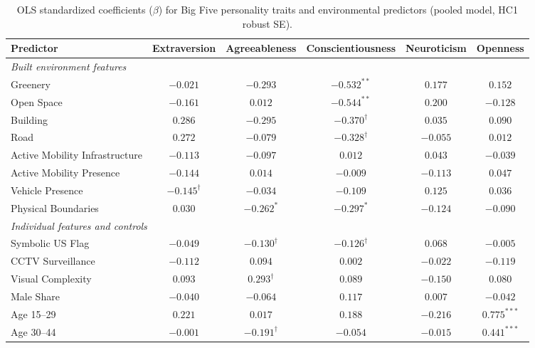 \begin{table}[htbp]
\centering
\footnotesize
\caption{OLS standardized coefficients ($\beta$) for Big Five personality traits and environmental predictors (pooled model, HC1 robust SE).}
\label{tab:ols_betas_ours_v2}
\begin{adjustbox}{max width=\linewidth, max totalheight=0.85\textheight, center}
\begin{tabular}{lccccc}
\toprule
\textbf{Predictor} & \textbf{Extraversion} & \textbf{Agreeableness} & \textbf{Conscientiousness} & \textbf{Neuroticism} & \textbf{Openness} \\
\midrule
\multicolumn{6}{l}{\textit{Built environment features}} \\
Greenery & $-0.021$ & $-0.293$ & $-0.532^{**}$ & $0.177$ & $0.152$ \\
Open Space & $-0.161$ & $0.012$ & $-0.544^{**}$ & $0.200$ & $-0.128$ \\
Building & $0.286$ & $-0.295$ & $-0.370^{\dagger}$ & $0.035$ & $0.090$ \\
Road & $0.272$ & $-0.079$ & $-0.328^{\dagger}$ & $-0.055$ & $0.012$ \\
Active Mobility Infrastructure & $-0.113$ & $-0.097$ & $0.012$ & $0.043$ & $-0.039$ \\
Active Mobility Presence & $-0.144$ & $0.014$ & $-0.009$ & $-0.113$ & $0.047$ \\
Vehicle Presence & $-0.145^{\dagger}$ & $-0.034$ & $-0.109$ & $0.125$ & $0.036$ \\
Physical Boundaries & $0.030$ & $-0.262^{*}$ & $-0.297^{*}$ & $-0.124$ & $-0.090$ \\
\midrule
\multicolumn{6}{l}{\textit{Individual features and controls}} \\
Symbolic US Flag & $-0.049$ & $-0.130^{\dagger}$ & $-0.126^{\dagger}$ & $0.068$ & $-0.005$ \\
CCTV Surveillance & $-0.112$ & $0.094$ & $0.002$ & $-0.022$ & $-0.119$ \\
Visual Complexity & $0.093$ & $0.293^{\dagger}$ & $0.089$ & $-0.150$ & $0.080$ \\
Male Share & $-0.040$ & $-0.064$ & $0.117$ & $0.007$ & $-0.042$ \\
Age 15--29 & $0.221$ & $0.017$ & $0.188$ & $-0.216$ & $0.775^{***}$ \\
Age 30--44 & $-0.001$ & $-0.191^{\dagger}$ & $-0.054$ & $-0.015$ & $0.441^{***}$ \\

\end{tabular}
\end{adjustbox}
\end{table}
